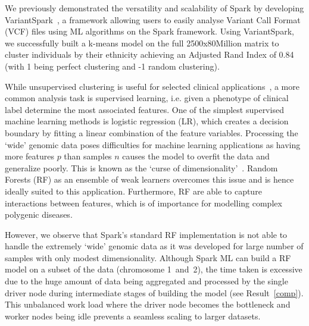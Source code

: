 \documentclass[10pt,letterpaper]{article}
\begin{document}
We previously demonstrated the versatility and scalability of Spark by developing VariantSpark~\cite{OBrien2015}, a
framework allowing users to easily analyse Variant Call Format (VCF) files using ML algorithms on the Spark framework.
Using VariantSpark, we successfully built a k-means model on the full 2500x80Million matrix to cluster individuals by
their ethnicity achieving an Adjusted Rand Index of 0.84 (with 1 being perfect clustering  and -1 random clustering).


While unsupervised clustering is useful for selected clinical applications~\cite{Li2015}, a more common analysis task is
supervised learning, i.e. given a phenotype of clinical label determine the most associated features.  One of the
simplest supervised machine learning methods is logistic regression (LR), which creates a decision boundary by fitting a
linear combination of the feature variables.  Processing the `wide' genomic data poses difficulties for machine learning
applications as having more features $p$ than samples $n$ causes the model to overfit the data and generalize poorly.
This is known as the `curse of dimensionality'~\cite{Bauer2014}.  Random Forests (RF) as an ensemble of weak learners 
overcomes this issue and is hence ideally suited to this application.  Furthermore, RF are able to capture interactions
between features, which is of importance for modelling complex polygenic diseases.



However, we observe that Spark's standard RF implementation is not able to handle the extremely `wide' genomic data as
it was developed for large number of samples with only modest dimensionality.  Although Spark ML can build a RF model on
a subset of the data (chromosome 1~and~2), the time taken is excessive due to the huge amount of data being aggregated
and processed by the single driver node during intermediate stages of building the model (see Result~\ref{comp}).  This
unbalanced work load where the driver node becomes the bottleneck and worker nodes being idle prevents a seamless
scaling to larger datasets.
\end{document}

